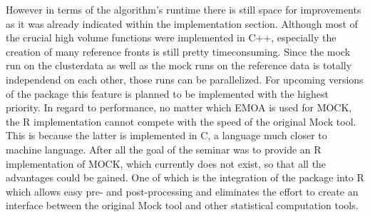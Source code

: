 \documentclass[parskip=half,DIV=14]{scrartcl}\usepackage[]{graphicx}\usepackage[]{color}
\begin{document}
However in terms of the algorithm's runtime there is still space for improvements as it was already indicated within the implementation section. Although most of the crucial high volume functions were implemented in C++, especially the creation of many reference fronts is still pretty timeconsuming. Since the mock run on the clusterdata as well as the mock runs on the reference data is totally independend on each other, those runs can be parallelized. For upcoming versions of the package this feature is planned to be implemented with the highest priority. In regard to performance, no matter which EMOA is used for MOCK, the R implementation cannot compete with the speed of the original Mock tool. This is because the latter is implemented in C, a language much closer to machine language. After all the goal of the seminar was to provide an R implementation of MOCK, which currently does not exist, so that all the advantages could be gained. One of which is the integration of the package into R which allows easy pre- and post-processing and eliminates the effort to create an interface between the original Mock tool and other statistical computation tools.
\printbibliography
\end{document}
